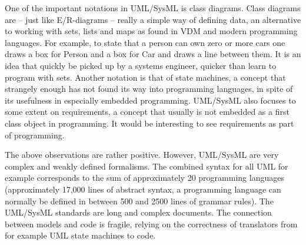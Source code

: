 One of the important notations in UML/SysML is class diagrams. 
Class diagrams are – just like E/R-diagrams – really a simple way 
of defining data, an alternative to working with sets, lists and 
maps as found in VDM and modern programming languages. For example, 
to state that a person can own zero or more cars one draws a box 
for Person and a box for Car and draws a line between them. It is 
an idea that quickly be picked up by a systems engineer, quicker 
than learn to program with sets. Another notation is that of state 
machines, a concept that strangely enough has not found its way 
into programming languages, in spite of its usefulness in 
especially embedded programming. UML/SysML also focuses to some 
extent on requirements, a concept that usually is not embedded as a 
first class object in programming. It would be interesting to see 
requirements as part of programming.

The above observations are rather positive. However, UML/SysML are 
very complex and weakly defined formalisms. The combined syntax for 
all UML for example corresponds to the sum of approximately 20 
programming languages (approximately 17,000 lines of abstract 
syntax, a programming language can normally be defined in between 
500 and 2500 lines of grammar rules). The UML/SysML standards are 
long and complex documents. The connection between models and code 
is fragile, relying on the correctness of translators from for 
example UML state machines to code. 
